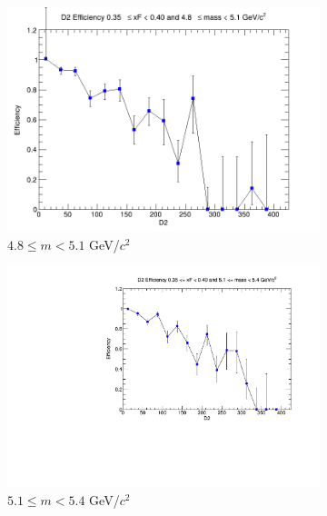 \documentclass[11pt]{article}
\begin{document}
\begin{figure}[p]
\begin{subfigure}[b]{0.32\textwidth}
        \includegraphics[width=\textwidth]{./kTrackerEfficiencyPlots/D2_Efficiency_xF7_mass2.png}
        \caption{$4.8 \leq m < 5.1$ GeV/$c^2$}
    \end{subfigure}\vspace{0.5cm}
    \begin{subfigure}[b]{0.32\textwidth}
        \centering
        \includegraphics[width=\textwidth]{./kTrackerEfficiencyPlots/D2_Efficiency_xF7_mass3.pdf}
        \caption{$5.1 \leq m < 5.4$ GeV/$c^2$}
    \end{subfigure}\hfill
    \begin{subfigure}[b]{0.32\textwidth}
        \centering

\end{subfigure}
\end{figure}
\end{document}

